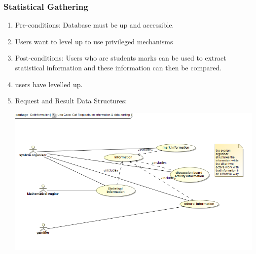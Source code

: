 \documentclass[hidelinks, 12pt, oneside]{article}
\begin{document}
\subsubsection{Statistical Gathering}
\begin{enumerate}
 \item Pre-conditions: Database must be up and accessible.

 \item Users want to level up to use privileged mechanisms 


\item Post-conditions: Users who are students marks can be used to extract statistical information and these information can then be compared.
 
  \item users have levelled up.

  
 \item Request and Result Data Structures:\\
  \centerline{\includegraphics[scale=0.4]{getInformation}}\\

\end{enumerate}
\end{document}
